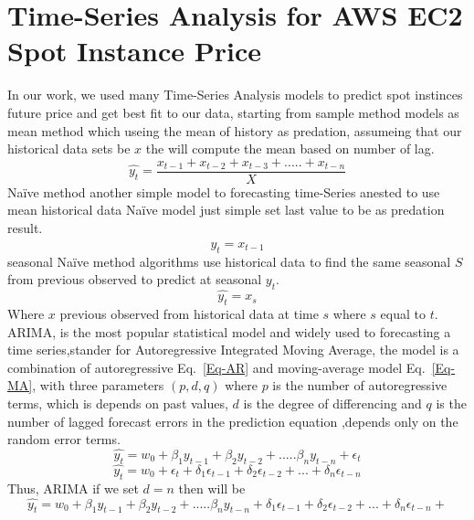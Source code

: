 \documentclass[graybox]{svmult}
\begin{document}
\section{Time-Series Analysis for AWS EC2 Spot Instance Price}
In our work, we used many Time-Series Analysis models to predict spot instinces future price and get best fit to our data, starting from sample method models as mean method which useing the mean of history as predation, assumeing that our historical data sets be \(x\) the will compute the mean based on number of lag.
\begin{equation}
\hat{y_t} = \frac{x_{t-1} +x_{t-2}+ x_{t-3}+.....+x_{t-n}}{X}
\label{mean}
\end{equation} 
Naïve method another simple model to forecasting time-Series anested to use mean historical data Naïve model just simple set last value to be as predation result. 
\begin{equation}
\hat{y_t} = x_{t-1} 
\label{naive}
\end{equation}
seasonal Naïve method algorithms use historical data to find the same seasonal \(S\) from previous observed to predict at seasonal \(y_t\). 
\begin{equation}
\hat{y_t} = x_s 
\label{smean}
\end{equation}
Where \(x\) previous observed from historical data at time \(s\) where \(s\) equal to \(t\).\\
ARIMA, is the most popular statistical model and widely used to forecasting a time series,stander for Autoregressive Integrated Moving Average, the model is a combination of  autoregressive Eq.~\ref{Eq-AR} and moving-average model Eq.~\ref{Eq-MA}, with three parameters  \((p,d,q)\) where \(p\) is the number of autoregressive terms, which is depends on past values, \(d\) is the degree of differencing and  \(q\) is the number of lagged forecast errors in the prediction equation ,depends only on the random error terms.
\begin{equation}
\hat{y_t} = w_0 +\beta_1 y_{t-1}+ \beta_2 y_{t-2}+.....\beta_n y_{t-n}+\epsilon_t
\label{Eq-AR}
\end{equation}
\begin{equation}
\hat{y_t} = w_0 +\epsilon_t + \delta_1 \epsilon_{t-1}+  \delta_2 \epsilon_{t-2}+...+ \delta_n \epsilon_{t-n}
\label{Eq-MA}
\end{equation}
Thus, ARIMA if we set \(d = n\) then will be 
\begin{equation}
\hat{y_t} = w_0 +\beta_1 y_{t-1}+ \beta_2 y_{t-2}+.....\beta_n y_{t-n} +  \delta_1 \epsilon_{t-1}+  \delta_2 \epsilon_{t-2}+...+ \delta_n \epsilon_{t-n}+
\label{Eq-ARIMA}
\end{equation}
\end{document}
